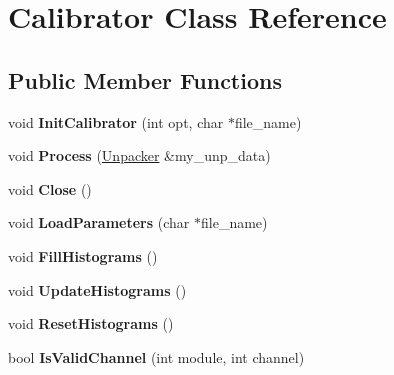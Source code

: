 \hypertarget{classCalibrator}{\section{Calibrator Class Reference}
\label{classCalibrator}
}
\subsection*{Public Member Functions}
\begin{DoxyCompactItemize}
\item 
\hypertarget{classCalibrator_ab5f8599bfe76d5ee9f3c94be7f96a6c1}{void {\bfseries Init\-Calibrator} (int opt, char $\ast$file\-\_\-name)}\label{classCalibrator_ab5f8599bfe76d5ee9f3c94be7f96a6c1}

\item 
\hypertarget{classCalibrator_a05db4315206d264bc5a9c74cabbc14fb}{void {\bfseries Process} (\hyperlink{classUnpacker}{Unpacker} \&my\-\_\-unp\-\_\-data)}\label{classCalibrator_a05db4315206d264bc5a9c74cabbc14fb}

\item 
\hypertarget{classCalibrator_aec31533133eb87e76da44683da4fee2e}{void {\bfseries Close} ()}\label{classCalibrator_aec31533133eb87e76da44683da4fee2e}

\item 
\hypertarget{classCalibrator_adfeadd24c49f1e863321f86b9acc9e9b}{void {\bfseries Load\-Parameters} (char $\ast$file\-\_\-name)}\label{classCalibrator_adfeadd24c49f1e863321f86b9acc9e9b}

\item 
\hypertarget{classCalibrator_a424c7d93e940d0a5694d8b0fe20ab08f}{void {\bfseries Fill\-Histograms} ()}\label{classCalibrator_a424c7d93e940d0a5694d8b0fe20ab08f}

\item 
\hypertarget{classCalibrator_a020dbfdbcf0bb66078c26fee6f27339c}{void {\bfseries Update\-Histograms} ()}\label{classCalibrator_a020dbfdbcf0bb66078c26fee6f27339c}

\item 
\hypertarget{classCalibrator_aca8d56ba263bce2069a65628c15309f6}{void {\bfseries Reset\-Histograms} ()}\label{classCalibrator_aca8d56ba263bce2069a65628c15309f6}

\item 
\hypertarget{classCalibrator_a3b61141b578d8713b0a1dc3ee554b489}{bool {\bfseries Is\-Valid\-Channel} (int module, int channel)}\label{classCalibrator_a3b61141b578d8713b0a1dc3ee554b489}


\end{DoxyCompactItemize}
